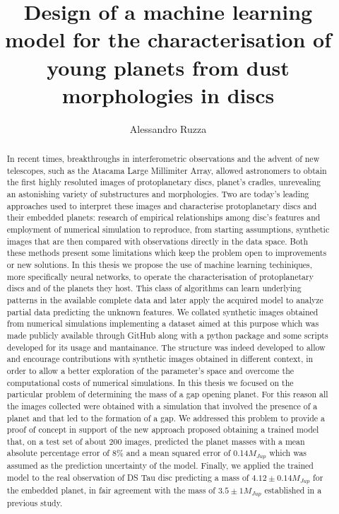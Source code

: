 \documentclass[a4paper,10pt]{report}
\title{Design of a machine learning model for the characterisation of young planets from dust morphologies in discs}
\author{Alessandro Ruzza}
\begin{document}


\begin{abstract}
    In recent times, breakthroughs in interferometric observations 
    and the advent of new telescopes, such as the Atacama Large Millimiter Array,
     allowed astronomers to obtain the first highly resoluted images of protoplanetary discs,
      planet's cradles, unrevealing an astonishing variety of substructures and morphologies. 
    Two are today's leading approaches used to interpret these images and characterise protoplanetary discs
     and their embedded planets:
      research of empirical relationships among disc’s features and 
      employment of numerical simulation to reproduce,  from starting assumptions,
        synthetic images that are then compared with  observations  directly  in  the  data  space.   
    Both  these  methods  present  some  limitations  which  keep  the problem open to improvements 
    or new solutions.  In this thesis we propose the use of machine learning techiniques,
     more specifically neural networks, to operate the characterisation of protoplanetary
      discs and of the planets they host.   This  class  of  algorithms  can  learn  underlying
        patterns  in  the  available  complete  data  and  later  apply  the acquired model 
        to analyze partial data predicting the unknown features.
    We collated synthetic images obtained from numerical simulations implementing
     a dataset aimed at this purpose which was made publicly available through GitHub
      along with a python package and some scripts developed for its usage and mantainance.
      The structure was indeed developed to allow and encourage contributions with synthetic images
      obtained in different context, in order to allow a better exploration of the parameter's space
       and overcome
      the computational costs of numerical simulations.
      In this thesis we focused on the particular problem of determining the mass of a gap opening planet.
      For this reason all the images collected were obtained with a simulation that involved the presence of a 
      planet and that led to the formation of a gap.
       We addressed this problem to provide a proof of concept in support of the new approach proposed
       obtaining a trained model that, on a test set of about 200 images, predicted the planet masses with 
       a mean absolute percentage error of 8\% and a mean squared error of 0.14$M_{Jup}$ which was assumed as the prediction uncertainty
        of the model.
        Finally, we applied the trained model to the real observation of DS Tau disc predicting a mass of $4.12\pm0.14 M_{Jup}$
        for the embedded planet, in fair agreement with the mass of $3.5\pm 1M_{Jup}$ established in a previous study.
\end{abstract}
\end{document}
